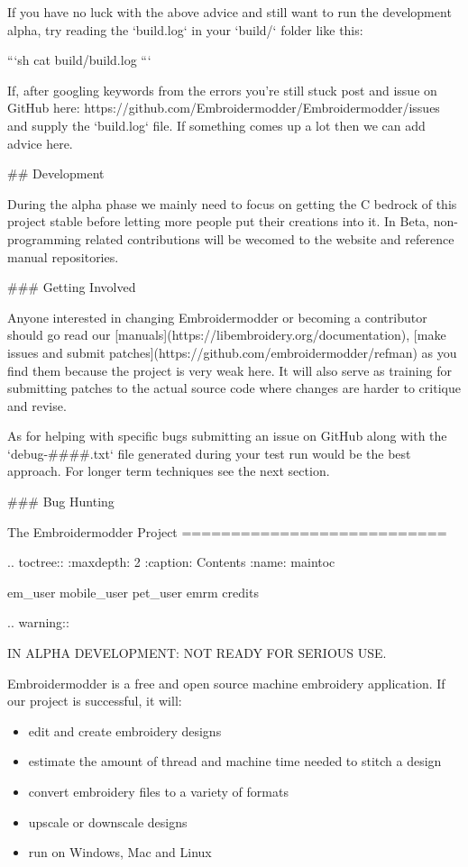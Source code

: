 If you have no luck with the above advice and still want to
run the development alpha, try reading the `build.log` in your
`build/` folder like this:

```sh
cat build/build.log
```

If, after googling keywords from the errors you're still stuck
post and issue on GitHub here: https://github.com/Embroidermodder/Embroidermodder/issues and supply the `build.log` file. If something
comes up a lot then we can add advice here.

## Development

During the alpha phase we mainly need to focus on getting the C bedrock of this project stable before letting more people
put their creations into it. In Beta, non-programming related contributions will be wecomed to the website and reference manual
repositories.

### Getting Involved

Anyone interested in changing Embroidermodder or becoming a contributor should go read our
[manuals](https://libembroidery.org/documentation), [make issues and submit patches](https://github.com/embroidermodder/refman)
as you find them because the project is very weak here. It will also serve as training for submitting patches to the actual
source code where changes are harder to critique and revise.

As for helping with specific bugs submitting an issue on GitHub along with the `debug-####.txt` file generated during
your test run would be the best approach. For longer term techniques see the next section.

### Bug Hunting

The Embroidermodder Project
===========================

.. toctree::
   :maxdepth: 2
   :caption: Contents
   :name: maintoc

   em_user
   mobile_user
   pet_user
   emrm
   credits

.. warning::

   IN ALPHA DEVELOPMENT: NOT READY FOR SERIOUS USE.

Embroidermodder is a free and open source machine embroidery application.
If our project is successful, it will:

\begin{itemize}
\item edit and create embroidery designs
\item estimate the amount of thread and machine time needed to stitch a design
\item convert embroidery files to a variety of formats
\item upscale or downscale designs
\item run on Windows, Mac and Linux
\end{itemize}

